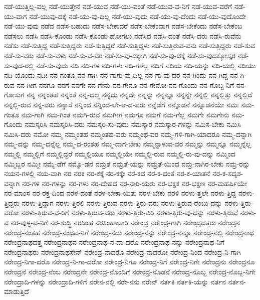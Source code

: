 {ನಡೆ-ಯುತ್ತಿಲ್ಲ-ವಲ್ಲ
ನಡೆ-ಯುತ್ತೇನೆ
ನಡೆ-ಯುವ
ನಡೆ-ಯು-ವಂತೆ
ನಡೆ-ಯುವ-ವ-ನಿಗೆ
ನಡೆ-ಯುವ-ವರೆಗೆ
ನಡೆ-ಯು-ವಾಗ
ನಡೆ-ಯುವು-ದಕ್ಕೆ
ನಡೆ-ಯು-ವು-ದಿಲ್ಲ
ನಡೆ-ಯು-ವುದು
ನಡೆ-ಯು-ವು-ದೆಂದು
ನಡೆ-ಯು-ವುದೊಂದೇ
ನಡೆ-ಯು-ವುವು
ನಡೆವ
ನಡೆಸ-ಬಹುದು
ನಡೆಸ-ಬೇಕಾದರೆ
ನಡೆಸ-ಬೇಕೆಂದಾಗ
ನಡೆಸ-ಬೇಕೆಂದು
ನಡೆಸ-ಬೇಕೆಂಬ
ನಡೆಸಲು
ನಡೆಸಿ
ನಡೆಸಿ-ಕೊಂಡು
ನಡೆಸಿ-ಕೊಂಡು-ಹೋಗಲು
ನಡೆಸಿದ
ನಡೆಸಿ-ದಂತೆ
ನಡೆಸಿ-ದರು
ನಡೆಸಿ-ರುವೆನು
ನಡೆಸು
ನಡೆ-ಸುತ್ತಿದ್ದ
ನಡೆ-ಸುತ್ತಿದ್ದರು
ನಡೆ-ಸುತ್ತಿದ್ದರೆ
ನಡೆ-ಸುತ್ತಿದ್ದಳು
ನಡೆ-ಸುತ್ತಿರುವ-ವನು
ನಡೆ-ಸುತ್ತಿದ್ದರು
ನಡೆ-ಸುವ
ನಡೆ-ಸು-ವರು
ನಡೆ-ಸು-ವಳು
ನಡೆ-ಸು-ವ-ವರ
ನಡೆ-ಸು-ವು-ದಕ್ಕಾಗಿ
ನಡೆ-ಸು-ವು-ದಕ್ಕೆ
ನಡೆ-ಸು-ವುದಕ್ಕೋಸ್ಕರ
ನಡೆ-ಸು-ವುದ-ರಲ್ಲಿ
ನಡೆ-ಸು-ವುದು
ನದಿ
ನದಿ-ಗಳ
ನದಿ-ಗಳು
ನದಿ-ಗಳೆಲ್ಲ
ನದಿಗೆ
ನದಿಯ
ನದಿ-ಯನ್ನು
ನದಿ-ಯಲ್ಲಿ
ನದಿಯು
ನದಿ-ಯೊಂದು
ನದೀ
ನನ-ಗಂತೂ
ನನ-ಗಾಗಿ
ನನ-ಗಾಗು-ವು-ದಿಲ್ಲ
ನನ-ಗಾ-ವು-ದರ
ನನ-ಗಿಂದು
ನನ-ಗಿದ್ದ
ನನ-ಗಿ-ರುವ
ನನ-ಗೀಗ
ನನಗೂ
ನನಗೆ
ನನಗೇ
ನನ-ಗೇನು
ನನ-ಗೇನೂ
ನನ-ಗೇನೋ
ನನ-ಗೊಂದು
ನನ-ಗೊಬ್ಬ-ನಿಗೆ
ನನ-ಗೋಸುಗ
ನನ್ನ
ನನ್ನಂತಹ
ನನ್ನಂತೆ
ನನ್ನ-ದಲ್ಲ
ನನ್ನದು
ನನ್ನದೇ
ನನ್ನನ್ನು
ನನ್ನನ್ನೂ
ನನ್ನನ್ನೇ
ನನ್ನಲ್ಲಿ
ನನ್ನಲ್ಲಿತ್ತು
ನನ್ನಲ್ಲಿದೆ
ನನ್ನಲ್ಲಿ-ರುವ
ನನ್ನ-ವರು
ನನ್ನಾಸೆ
ನನ್ನಿಂದ
ನನ್ನಿಂದ-ಲೇ-ಆ-ದ-ವರು
ನನ್ನೆಡೆಗೆ
ನನ್ನೊಡನೆ
ನನ್ನೊಡನೆಯೇ
ನಮಃ
ನಮ-ಗಂತೂ
ನಮ-ಗಾಗಿ
ನಮ-ಗಿಂತ
ನಮಗಿ-ರುವ
ನಮಗೀಗ
ನಮಗೂ
ನಮಗೆ
ನಮ-ಗೆಲ್ಲ
ನಮಗೇ
ನಮಗೇನು
ನಮ-ಗೊಂದು
ನಮಸ್ಕರಿಸಿ
ನಮಸ್ಕರಿಸಿ-ದರು
ನಮಸ್ಕರಿ-ಸು-ವುದು
ನಮಸ್ಕಾರ
ನಮಸ್ಕಾರ-ಗಳನ್ನು
ನಮಿಸ-ಬೇಕು
ನಮಿಸಿ
ನಮಿಸಿ-ದರು
ನಮೋ
ನಮ್ಮ
ನಮ್ಮಂತಹ
ನಮ್ಮಂತಹ-ವರು
ನಮ್ಮಂಥ-ವರ
ನಮ್ಮ-ಗಳಿ-ಗಾಗಿ-ಯಾದರೂ
ನಮ್ಮ-ದನ್ನಾಗಿ
ನಮ್ಮ-ದನ್ನು
ನಮ್ಮ-ದನ್ನೆಲ್ಲ
ನಮ್ಮ-ದ-ರಂತಹ
ನಮ್ಮ-ದಾಗ-ಬೇಕು
ನಮ್ಮನ್ನಾಳುವ-ವರ
ನಮ್ಮನ್ನು
ನಮ್ಮನ್ನೂ
ನಮ್ಮನ್ನೆಲ್ಲ
ನಮ್ಮಲ್ಲಿ
ನಮ್ಮಲ್ಲಿಗೆ
ನಮ್ಮಲ್ಲಿದ್ದರೆ
ನಮ್ಮಲ್ಲಿಯೂ
ನಮ್ಮಲ್ಲಿಯೇ
ನಮ್ಮಲ್ಲಿ-ರುವ
ನಮ್ಮಲ್ಲಿ-ರು-ವು-ದನ್ನು
ನಮ್ಮಿಂದ
ನಮ್ಮಿಬ್ಬರ
ನಮ್ಮೀ
ನಮ್ಮೆ-ಡೆಗೆ
ನಮ್ಮೊ-ಡನೆ
ನಮ್ರತೆ
ನಮ್ರತೆ-ಯನ್ನು
ನಮ್ರತೆ-ಯಿಂದ
ನಮ್ರ-ನಾಗಿರ-ಬೇಕು
ನಮ್ರ-ರನ್ನು
ನಯನ-ಗಳಲ್ಲಿ
ನಯ-ವಾಗಿ
ನರ
ನರಕ
ನರ-ಕಕ್ಕೆ
ನರ-ಕಕ್ಕೇ
ನರ-ಕದ
ನರ-ಕ-ದಂತೆ
ನರ-ಕ-ಯಾತನೆ
ನರ-ಕ-ಸದೃಶ-ವನ್ನಾಗಿ
ನರ-ಗಳ
ನರ-ಗಳನ್ನು
ನರ-ಗಳು
ನರ-ದೇಹದ
ನರ-ನಾರಿ-ಯರು
ನರ-ಭಕ್ಷಕ
ನರ-ಭಕ್ಷಣ
ನರ-ಮಹರ್ಷಿಯೇ
ನರ-ಮಾಂಸ
ನರ-ರಕ್ತ-ದಿಂದ
ನರಳ-ದಂತೆ
ನರಳ-ಬೇಕಾ-ಯಿತು
ನರಳ-ಬೇಕು
ನರಳಿ
ನರಳು-ತ್ತಲೇ
ನರಳು-ತ್ತಿದ್ದ
ನರಳು-ತ್ತಿದ್ದರು
ನರಳು-ತ್ತಿದ್ದಾಗ
ನರಳು-ತ್ತಿರಲಿ
ನರಳು-ತ್ತಿರುವ
ನರಳು-ತ್ತಿರು-ವರು
ನರಳು-ತ್ತಿರುವ-ರೆಂಬು-ದನ್ನು
ನರಳು-ತ್ತಿರು-ವರೋ
ನರಳು-ತ್ತಿರುವ-ವ-ರಿಗೆ
ನರಳು-ತ್ತಿರುವ-ವರು
ನರಳು-ತ್ತಿರು-ವಿರಿ
ನರಳು-ತ್ತಿರು-ವು-ದನ್ನು
ನರಳು-ತ್ತಿರುವೆ
ನರಳು-ವ
ನರ-ವುಳ್ಳ-ವ-ನಿಗೆ
ನರ-ಶುದ್ಧಿ
ನರಸಿಂಹ
ನರಸಿಂಹಾಚಾರಿ
ನರೇಂದ್ರ
ನರೇಂದ್ರ-ಗಾಗಿ
ನರೇಂದ್ರದತ್ತರು
ನರೇಂದ್ರನ
ನರೇಂದ್ರ-ನಂತಹ
ನರೇಂದ್ರ-ನಂಥವ-ನಿಗೆ
ನರೇಂದ್ರ-ನದು
ನರೇಂದ್ರ-ನನ್ನು
ನರೇಂದ್ರ-ನನ್ನೂ
ನರೇಂದ್ರ-ನಲ್ಲಿ
ನರೇಂದ್ರನಾಥ
ನರೇಂದ್ರನಾಥದತ್ತ
ನರೇಂದ್ರನಾಥನ
ನರೇಂದ್ರನಾಥ-ನ-ದಾ-ದರೊ
ನರೇಂದ್ರನಾಥ-ನನ್ನು
ನರೇಂದ್ರನಾಥ-ನಿಗೆ
ನರೇಂದ್ರನಾಥರು
ನರೇಂದ್ರನಾಥಸೇನ್
ನರೇಂದ್ರ-ನಾದರೊ
ನರೇಂದ್ರ-ನಾದರೋ
ನರೇಂದ್ರ-ನಿಂದ
ನರೇಂದ್ರ-ನಿ-ಗಾಗಿ
ನರೇಂದ್ರ-ನಿಗಾ-ದರೊ
ನರೇಂದ್ರ-ನಿ-ಗಾ-ದರೋ
ನರೇಂದ್ರ-ನಿಗೂ
ನರೇಂದ್ರ-ನಿಗೆ
ನರೇಂದ್ರ-ನಿಗೇ
ನರೇಂದ್ರನು
ನರೇಂದ್ರನೂ
ನರೇಂದ್ರನೆ
ನರೇಂದ್ರ-ನೆಂಬ
ನರೇಂದ್ರನೇ
ನರೇಂದ್ರ-ನೊಂದಿಗೆ
ನರೇಂದ್ರ-ನೊಡನೆ
ನರೇಂದ್ರ-ನೊಬ್ಬ
ನರೇಂದ್ರ-ನೊಬ್ಬ-ನಿಗೇ
ನರೇಂದ್ರಾದಿ-ಗಳನ್ನು
ನರೇಂದ್ರಾದಿ-ಗಳಿಗೆ
ನರೇನ-ನಲ್ಲಿ
ನರೇ-ನನು
ನರೇನ್
ನರ್ತಕಿ
ನರ್ತಕಿ-ಯನ್ನು
ನರ್ತನ
ನರ್ತನ-ಮಾಡುತ್ತಿದೆ
}
